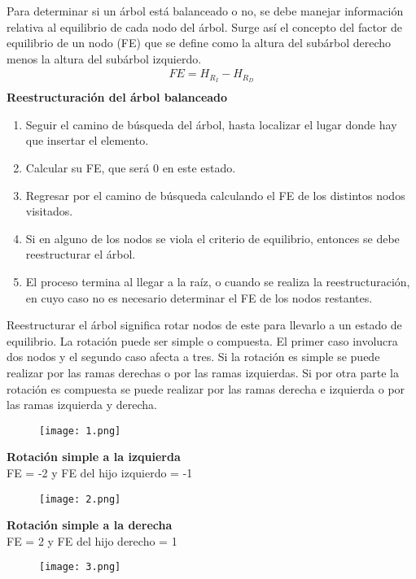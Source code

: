 \documentclass{article}
\begin{document}
Para determinar si un árbol está balanceado o no, se debe manejar información relativa al equilibrio de cada nodo del árbol. Surge así el concepto del factor de equilibrio de un nodo (FE) que se define como la altura del subárbol derecho menos la altura del subárbol izquierdo.
\begin{align*}
FE = H_{R_I} - H_{R_D}\\
\end{align*}
\newpage
\textbf{Reestructuración del árbol balanceado}\\
\begin{enumerate}
\item Seguir el camino de búsqueda del árbol, hasta localizar el lugar donde hay que insertar el elemento.
\item Calcular su FE, que será 0 en este estado.
\item Regresar por el camino de búsqueda calculando el FE de los distintos nodos visitados.
\item Si en alguno de los nodos se viola el criterio de equilibrio, entonces se debe reestructurar el árbol.
\item El proceso termina al llegar a la raíz, o cuando se realiza la reestructuración, en cuyo caso no es necesario determinar el FE de los nodos restantes.
\end{enumerate}

Reestructurar el árbol significa rotar nodos de este para llevarlo a un estado de equilibrio. La rotación puede ser simple o compuesta. El primer caso involucra dos nodos y el segundo caso afecta a tres. Si la rotación es simple se puede realizar por las ramas derechas o por las ramas izquierdas. Si por otra parte la rotación es compuesta se puede realizar por las ramas derecha e izquierda o por las ramas izquierda y derecha.\\
\begin{figure}[ht]
\centering
\texttt{[image: 1.png]}
\end{figure}

\textbf{Rotación simple a la izquierda}\\

FE = -2 y  FE del hijo izquierdo = -1
\begin{figure}[ht]
\centering
\texttt{[image: 2.png]}
\end{figure}
\newpage
\textbf{Rotación simple a la derecha}\\

FE = 2 y  FE del hijo derecho = 1
\begin{figure}[ht]
\centering
\texttt{[image: 3.png]}
\end{figure}
\end{document}
